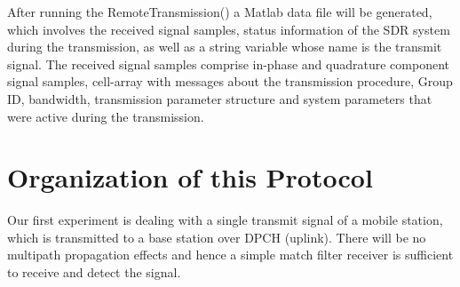 After running the RemoteTransmission() a Matlab data file will be generated, which involves the received signal samples, status information of the SDR system during the transmission, as well as a string variable whose name is the transmit signal. The received signal samples comprise in-phase and quadrature component signal samples, cell-array with messages about the transmission procedure, Group ID, bandwidth, transmission parameter structure and system parameters that were active during the transmission.  
\section{Organization of this Protocol}
Our first experiment is dealing with a single transmit signal of a mobile station, which is transmitted to a base station over DPCH (uplink). There will be no multipath propagation effects and hence a simple match filter receiver is sufficient to receive and detect the signal.